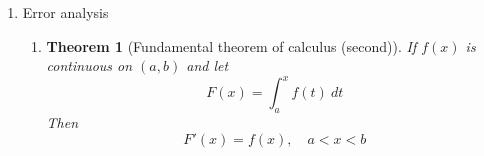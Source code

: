 \documentclass{article}
\newtheorem{thm}{Theorem}[section]
\theoremstyle{remark}
\begin{document}
\begin{enumerate}
\begin{enumerate}
\item Rectanglular rule: Degree 0 polynomial on subinterval.
\begin{itemize}
\item Left point rule with node $x = x_{i-1}$
$$
\int_a^bf(x)~dx \approx\sum_{i=1}^n f(x_{i-1})(x_i-x_{i-1})
$$
\item Right point rule with node $x=x_i$
$$
\int_a^bf(x)~dx \approx \sum_{i=1}^n f(x_{i})(x_i-x_{i-1})
$$
\item Midpoint rule with node $x = (x_{i-1}+ x_i)/2$
$$
\int_a^bf(x)~dx \approx \sum_{i=1}^n f\Big(\frac{x_{i-1}+x_i}{2}\Big)(x_i-x_{i-1})
$$
\end{itemize}

\item Trapezoid rule: Linear polynomial on subinterval.
\begin{itemize}
\item Nodes: $x_{i-1}$ and $x_i$ both used.
\item Trapezoid rule
$$
\int_a^bf(x)~dx \approx \sum_{i=1}^n \frac{1}{2}\Big(f(x_{i-1})+f(x_i)\Big)(x_i-x_{i-1})
$$
\end{itemize}


\item Example
\begin{itemize}
\item Use 4 different formula to compute
$$
\int_0^2 e^{-x^2}~dx
$$
\item Matlab example
\item Left/right formula: $O(h)$
\item Midpoint/Trapezoid: $O(h^2)$
\item Mid point error = $1/2$ Trapezoid error
\item How to see rate of convergence? Create a log of errors halfing the stepsize at each step.
\[
\frac{e_h}{e_{h/2}} = \frac{\mathcal{O}(h^p)}{\mathcal{O}((h/2)^p)} \approx 2^p
\]
Then, for $h$ small,
\[
p \approx \log_2\left( \frac{e_h}{e_{h/2}} \right)
\]
Add this to sample code.
\end{itemize}
\end{enumerate}

\item Error analysis
\begin{enumerate}
\item 
\begin{thm}[Fundamental theorem of calculus (second)]
If $f(x)$ is continuous on $(a,b)$ and let 
$$
F(x) =\int_a^x f(t)~dt
$$
Then 
$$
F'(x) = f(x),\quad a<x<b
$$
\end{thm}


\end{enumerate}
\end{enumerate}
\end{document}

